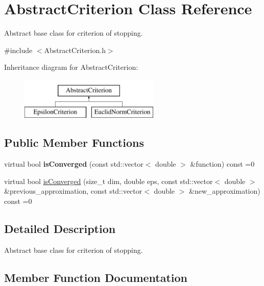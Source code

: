 \hypertarget{class_abstract_criterion}{}\section{Abstract\+Criterion Class Reference}
\label{class_abstract_criterion}


Abstract base class for criterion of stopping.  




{\ttfamily \#include $<$Abstract\+Criterion.\+h$>$}

Inheritance diagram for Abstract\+Criterion\+:\begin{figure}[H]
\begin{center}
\leavevmode
\includegraphics[height=2.000000cm]{class_abstract_criterion}
\end{center}
\end{figure}
\subsection*{Public Member Functions}
\begin{DoxyCompactItemize}
\item 
\mbox{\label{class_abstract_criterion_a24c1c32d99515c05fdde1c851e12f83f}} 
virtual bool {\bfseries is\+Converged} (const std\+::vector$<$ double $>$ \&function) const =0
\item 
virtual bool \hyperlink{class_abstract_criterion_aa38fc5fe24aabd2b925509961eb017df}{is\+Converged} (size\+\_\+t dim, double eps, const std\+::vector$<$ double $>$ \&previous\+\_\+approximation, const std\+::vector$<$ double $>$ \&new\+\_\+approximation) const =0
\end{DoxyCompactItemize}


\subsection{Detailed Description}
Abstract base class for criterion of stopping. 

\subsection{Member Function Documentation}
\mbox{\label{class_abstract_criterion_aa38fc5fe24aabd2b925509961eb017df}} 
